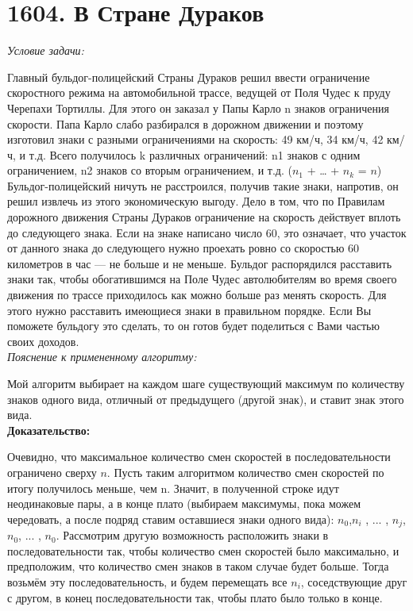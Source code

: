 \section{1604. В Стране Дураков}
\textit{Условие задачи:} \par
Главный бульдог-полицейский Страны Дураков решил ввести ограничение скоростного режима на автомобильной трассе, ведущей
от Поля Чудес к пруду Черепахи Тортиллы. Для этого он заказал у Папы Карло n знаков ограничения скорости. Папа Карло
слабо разбирался в дорожном движении и поэтому изготовил знаки с разными ограничениями на скорость: 49 км/ч, 34 км/ч, 42 км/ч, и т.д.
Всего получилось k различных ограничений: n1 знаков с одним ограничением, n2 знаков со вторым ограничением, и т.д. ($n_1$ + … + $n_k$ = $n$)
Бульдог-полицейский ничуть не расстроился, получив такие знаки, напротив, он решил извлечь из этого экономическую выгоду.
Дело в том, что по Правилам дорожного движения Страны Дураков ограничение на скорость действует вплоть до следующего знака.
Если на знаке написано число 60, это означает, что участок от данного знака до следующего нужно проехать ровно со скоростью
60 километров в час — не больше и не меньше. Бульдог распорядился расставить знаки так, чтобы обогатившимся на Поле Чудес
автолюбителям во время своего движения по трассе приходилось как можно больше раз менять скорость. Для этого нужно расставить
имеющиеся знаки в правильном порядке. Если Вы поможете бульдогу это сделать, то он готов будет поделиться с Вами частью своих доходов.\\
\textit{Пояснение к примененному алгоритму:} \par
Мой алгоритм выбирает на каждом шаге существующий максимум по количеству знаков одного вида, отличный от предыдущего (другой знак),
и ставит знак этого вида.\\
\textbf{Доказательство:} \par
Очевидно, что максимальное количество смен скоростей в последовательности ограничено сверху $n$.
Пусть таким алгоритмом количество смен скоростей по итогу получилось меньше, чем n. Значит, в полученной
строке идут неодинаковые пары, а в конце плато (выбираем максимумы, пока можем чередовать, а после подряд ставим оставшиеся знаки одного вида):
$n_0$,$n_i$ , ... , $n_j$,$n_0$, ... , $n_0$.
Рассмотрим другую возможность расположить знаки в последовательности так, чтобы количество смен скоростей было максимально,
и предположим, что количество смен знаков в таком случае будет больше. Тогда возьмём эту последовательность, и
будем перемещать все $n_i$, соседствующие друг с другом, в конец последовательности так, чтобы плато было только в конце.
